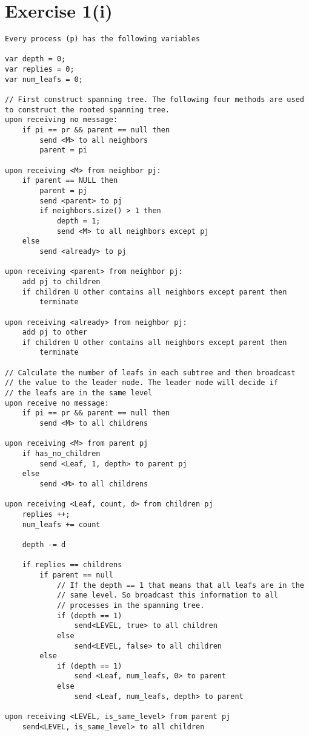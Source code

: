 \section*{Exercise 1(i)}

\begin{lstlisting}[style=mycode]
Every process (p) has the following variables

var depth = 0;
var replies = 0;
var num_leafs = 0;

// First construct spanning tree. The following four methods are used
to construct the rooted spanning tree.
upon receiving no message:
	if pi == pr && parent == null then
		send <M> to all neighbors
		parent = pi

upon receiving <M> from neighbor pj:
	if parent == NULL then
		parent = pj
		send <parent> to pj
		if neighbors.size() > 1 then
			depth = 1;
			send <M> to all neighbors except pj
	else
		send <already> to pj

upon receiving <parent> from neighbor pj:
	add pj to children
	if children U other contains all neighbors except parent then
		terminate

upon receiving <already> from neighbor pj:
	add pj to other
	if children U other contains all neighbors except parent then
		terminate

// Calculate the number of leafs in each subtree and then broadcast
// the value to the leader node. The leader node will decide if
// the leafs are in the same level
upon receive no message:
	if pi == pr && parent == null then
		send <M> to all childrens

upon receiving <M> from parent pj
	if has_no_children 
		send <Leaf, 1, depth> to parent pj
	else 
		send <M> to all childrens

upon receiving <Leaf, count, d> from children pj
	replies ++;
	num_leafs += count

	depth -= d

	if replies == childrens
		if parent == null
			// If the depth == 1 that means that all leafs are in the
			// same level. So broadcast this information to all
			// processes in the spanning tree.
			if (depth == 1)
				send<LEVEL, true> to all children
			else 
				send<LEVEL, false> to all children
		else 
			if (depth == 1)
				send <Leaf, num_leafs, 0> to parent
			else 
				send <Leaf, num_leafs, depth> to parent

upon receiving <LEVEL, is_same_level> from parent pj
	send<LEVEL, is_same_level> to all children
	
\end{lstlisting}

